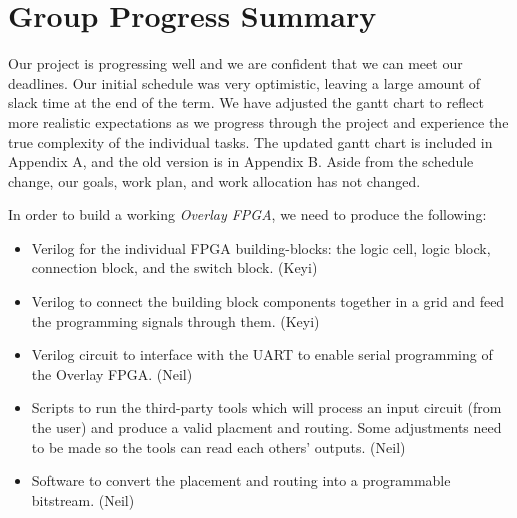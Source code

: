 \section{Group Progress Summary}

%
%
%


Our project is progressing well and we are confident that we can meet our deadlines.
Our initial schedule was very optimistic, leaving a large amount of slack time at the end of the term.
We have adjusted the gantt chart to reflect more realistic expectations as we progress through the project and experience the true complexity of the individual tasks.
The updated gantt chart is included in Appendix A, and the old version is in Appendix B.
Aside from the schedule change, our goals, work plan, and work allocation has not changed.

In order to build a working \emph{Overlay FPGA}, we need to produce the following:
\begin{itemize}
\item Verilog for the individual FPGA building-blocks: the logic cell, logic block, connection block, and the switch block. (Keyi)
\item Verilog to connect the building block components together in a grid and feed the programming signals through them. (Keyi)
\item Verilog circuit to interface with the UART to enable serial programming of the Overlay FPGA. (Neil)
\item Scripts to run the third-party tools which will process an input circuit (from the user) and produce a valid placment and routing. Some adjustments need to be made so the tools can read each others' outputs. (Neil)
\item Software to convert the placement and routing into a programmable bitstream. (Neil)
\end{itemize}


